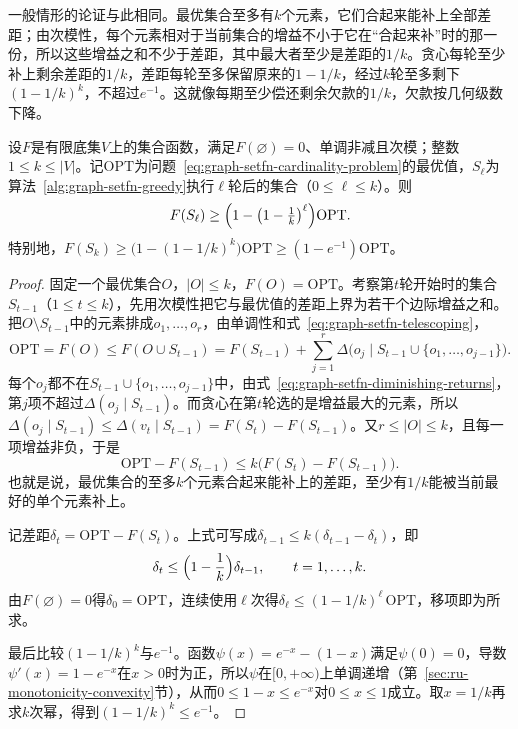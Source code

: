一般情形的论证与此相同。最优集合至多有$k$个元素，它们合起来能补上全部差距；由次模性，每个元素相对于当前集合的增益不小于它在“合起来补”时的那一份，所以这些增益之和不少于差距，其中最大者至少是差距的$1/k$。贪心每轮至少补上剩余差距的$1/k$，差距每轮至多保留原来的$1-1/k$，经过$k$轮至多剩下$(1-1/k)^k$，不超过$e^{-1}$。这就像每期至少偿还剩余欠款的$1/k$，欠款按几何级数下降。

\begin{theorem}[贪心的近似保证]
\label{thm:graph-setfn-greedy-guarantee}
设$F$是有限底集$V$上的集合函数，满足$F(\varnothing)=0$、单调非减且次模；整数$1\leq k\leq|V|$。记$\mathrm{OPT}$为问题~\eqref{eq:graph-setfn-cardinality-problem}的最优值，$S_\ell$为算法~\ref{alg:graph-setfn-greedy}执行$\ell$轮后的集合（$0\leq\ell\leq k$）。则
\[
  F(S_\ell)\geq\Bigl(1-\bigl(1-\tfrac1k\bigr)^{\ell}\Bigr)\mathrm{OPT}.
\]
特别地，$F(S_k)\geq\bigl(1-(1-1/k)^k\bigr)\mathrm{OPT}\geq(1-e^{-1})\mathrm{OPT}$。
\end{theorem}

\begin{proof}
固定一个最优集合$O$，$|O|\leq k$，$F(O)=\mathrm{OPT}$。考察第$t$轮开始时的集合$S_{t-1}$（$1\leq t\leq k$），先用次模性把它与最优值的差距上界为若干个边际增益之和。把$O\setminus S_{t-1}$中的元素排成$o_1,\ldots,o_r$，由单调性和式~\eqref{eq:graph-setfn-telescoping}，
\[
  \mathrm{OPT}=F(O)\leq F(O\cup S_{t-1})
  =F(S_{t-1})+\sum_{j=1}^{r}\Delta\bigl(o_j\mid S_{t-1}\cup\{o_1,\ldots,o_{j-1}\}\bigr).
\]
每个$o_j$都不在$S_{t-1}\cup\{o_1,\ldots,o_{j-1}\}$中，由式~\eqref{eq:graph-setfn-diminishing-returns}，第$j$项不超过$\Delta(o_j\mid S_{t-1})$。而贪心在第$t$轮选的是增益最大的元素，所以$\Delta(o_j\mid S_{t-1})\leq\Delta(v_t\mid S_{t-1})=F(S_t)-F(S_{t-1})$。又$r\leq|O|\leq k$，且每一项增益非负，于是
\[
  \mathrm{OPT}-F(S_{t-1})\leq k\bigl(F(S_t)-F(S_{t-1})\bigr).
\]
也就是说，最优集合的至多$k$个元素合起来能补上的差距，至少有$1/k$能被当前最好的单个元素补上。

记差距$\delta_t=\mathrm{OPT}-F(S_t)$。上式可写成$\delta_{t-1}\leq k(\delta_{t-1}-\delta_t)$，即
\[
  \delta_t\leq\Bigl(1-\frac1k\Bigr)\delta_{t-1},\qquad t=1,\ldots,k.
\]
由$F(\varnothing)=0$得$\delta_0=\mathrm{OPT}$，连续使用$\ell$次得$\delta_\ell\leq(1-1/k)^\ell\,\mathrm{OPT}$，移项即为所求。

最后比较$(1-1/k)^k$与$e^{-1}$。函数$\psi(x)=e^{-x}-(1-x)$满足$\psi(0)=0$，导数$\psi'(x)=1-e^{-x}$在$x>0$时为正，所以$\psi$在$[0,+\infty)$上单调递增（第~\ref{sec:ru-monotonicity-convexity}节），从而$0\leq1-x\leq e^{-x}$对$0\leq x\leq1$成立。取$x=1/k$再求$k$次幂，得到$(1-1/k)^k\leq e^{-1}$。
\end{proof}


